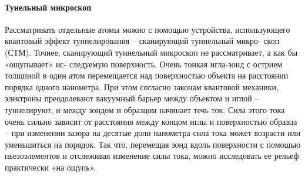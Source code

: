 \paragraph{Тунельный микроскоп}
Рассматривать отдельные атомы можно с помощью устройства, использующего квантовый эффект
туннелирования – сканирующий туннельный микро- скоп (СТМ). Точнее, сканирующий туннельный
микроскоп не рассматривает, а как бы «ощупывает» ис- следуемую поверхность. Очень тонкая
игла-зонд с острием толщиной в один атом перемещается над поверхностью объекта на расстоянии
порядка одного нанометра. При этом согласно законам квантовой механики, электроны преодолевают
вакуумный барьер между объектом и иглой – туннелируют, и между зондом и образцом начинает
течь ток. Сила этого тока очень сильно зависит от расстояния между концом иглы и поверхностью
образца – при изменении зазора на десятые доли нанометра сила тока может возрасти или
уменьшиться на порядок. Так что, перемещая зонд вдоль поверхности с помощью пьезоэлементов
и отслеживая изменение силы тока, можно исследовать ее рельеф практически «на ощупь».

